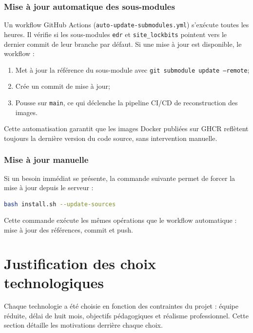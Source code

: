 \subsubsection{Mise à jour automatique des sous-modules}

Un workflow GitHub Actions (\texttt{auto-update-submodules.yml}) s'exécute
toutes les heures. Il vérifie si les sous-modules \texttt{edr} et
\texttt{site\_lockbits} pointent vers le dernier commit de leur branche par
défaut. Si une mise à jour est disponible, le workflow :

\begin{enumerate}
  \item Met à jour la référence du sous-module avec
    \texttt{git submodule update --remote};
  \item Crée un commit de mise à jour;
  \item Pousse sur \texttt{main}, ce qui déclenche la pipeline CI/CD de
    reconstruction des images.
\end{enumerate}

Cette automatisation garantit que les images Docker publiées sur GHCR
reflètent toujours la dernière version du code source, sans intervention
manuelle.

\subsubsection{Mise à jour manuelle}

Si un besoin immédiat se présente, la commande suivante permet de forcer la
mise à jour depuis le serveur :

\begin{lstlisting}[language=bash, caption={Mise à jour manuelle des sous-modules}]
bash install.sh --update-sources
\end{lstlisting}

Cette commande exécute les mêmes opérations que le workflow automatique :
mise à jour des références, commit et push.

\section{Justification des choix technologiques}

Chaque technologie a été choisie en fonction des contraintes du projet :
équipe réduite, délai de huit mois, objectifs pédagogiques et réalisme
professionnel. Cette section détaille les motivations derrière chaque
choix.

